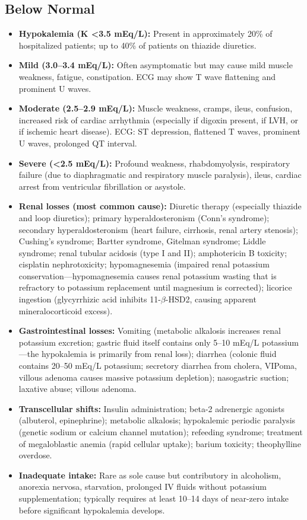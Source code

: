 \subsection*{Below Normal}
\begin{itemize}
  \item \textbf{Hypokalemia (K <3.5 mEq/L):} Present in approximately 20\% of hospitalized patients; up to 40\% of patients on thiazide diuretics.
  \item \textbf{Mild (3.0--3.4 mEq/L):} Often asymptomatic but may cause mild muscle weakness, fatigue, constipation. ECG may show T wave flattening and prominent U waves.
  \item \textbf{Moderate (2.5--2.9 mEq/L):} Muscle weakness, cramps, ileus, confusion, increased risk of cardiac arrhythmia (especially if digoxin present, if LVH, or if ischemic heart disease). ECG: ST depression, flattened T waves, prominent U waves, prolonged QT interval.
  \item \textbf{Severe (<2.5 mEq/L):} Profound weakness, rhabdomyolysis, respiratory failure (due to diaphragmatic and respiratory muscle paralysis), ileus, cardiac arrest from ventricular fibrillation or asystole.
  \item \textbf{Renal losses (most common cause):} Diuretic therapy (especially thiazide and loop diuretics); primary hyperaldosteronism (Conn's syndrome); secondary hyperaldosteronism (heart failure, cirrhosis, renal artery stenosis); Cushing's syndrome; Bartter syndrome, Gitelman syndrome; Liddle syndrome; renal tubular acidosis (type I and II); amphotericin B toxicity; cisplatin nephrotoxicity; hypomagnesemia (impaired renal potassium conservation---hypomagnesemia causes renal potassium wasting that is refractory to potassium replacement until magnesium is corrected); licorice ingestion (glycyrrhizic acid inhibits 11-$\beta$-HSD2, causing apparent mineralocorticoid excess).
  \item \textbf{Gastrointestinal losses:} Vomiting (metabolic alkalosis increases renal potassium excretion; gastric fluid itself contains only 5--10 mEq/L potassium---the hypokalemia is primarily from renal loss); diarrhea (colonic fluid contains 20--50 mEq/L potassium; secretory diarrhea from cholera, VIPoma, villous adenoma causes massive potassium depletion); nasogastric suction; laxative abuse; villous adenoma.
  \item \textbf{Transcellular shifts:} Insulin administration; beta-2 adrenergic agonists (albuterol, epinephrine); metabolic alkalosis; hypokalemic periodic paralysis (genetic sodium or calcium channel mutation); refeeding syndrome; treatment of megaloblastic anemia (rapid cellular uptake); barium toxicity; theophylline overdose.
  \item \textbf{Inadequate intake:} Rare as sole cause but contributory in alcoholism, anorexia nervosa, starvation, prolonged IV fluids without potassium supplementation; typically requires at least 10--14 days of near-zero intake before significant hypokalemia develops.
\end{itemize}

